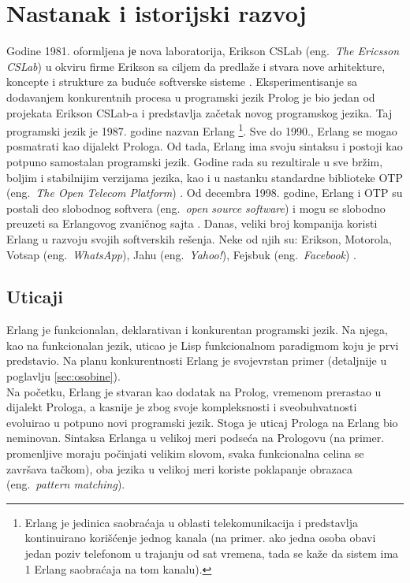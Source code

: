 \documentclass[a4paper]{article}
\begin{document}
\section{Nastanak i istorijski razvoj}
\label{sec:nastanak}
Godine 1981. oformljena је nova laboratorija, Erikson CSLab (eng.~{\em The Ericsson CSLab}) u okviru firme Erikson sa
ciljem da predlaže i stvara nove arhitekture, koncepte i strukture za buduće softverske sisteme \cite{phdthesis}.
Eksperimentisanje sa dodavanjem konkurentnih procesa u programski jezik Prolog je bio jedan
od projekata Erikson CSLab-a i predstavlja začetak novog programskog jezika.
Taj programski jezik je 1987. godine nazvan Erlang
\footnote{ Erlang je jedinica saobraćaja u oblasti telekomunikacija 
i predstavlja kontinuirano korišćenje jednog kanala 
(na primer. ako jedna osoba obavi jedan poziv telefonom u trajanju od sat vremena, 
tada se kaže da sistem ima 1 Erlang saobraćaja na tom kanalu).}.    
Sve do 1990., Erlang se mogao posmatrati kao dijalekt Prologa. Od tada, Erlang
ima svoju sintaksu i postoji kao potpuno samostalan programski jezik.
Godine rada su rezultirale u sve bržim, boljim i stabilnijim verzijama jezika, kao
i u nastanku standardne biblioteke OTP (eng.~{\em The Open Telecom Platform}) \cite{phdthesis}.
Od decembra 1998. godine, Erlang i OTP su postali deo slobodnog softvera (eng.~{\em open source software})
i mogu se slobodno preuzeti sa Erlangovog zvaničnog sajta \cite{sajt}.
Danas, veliki broj kompanija koristi Erlang u razvoju
svojih softverskih rešenja. Neke od njih su: Erikson, Motorola, Votsap (eng.~{\em WhatsApp}), 
Jahu (eng.~{\em Yahoo!}), Fejsbuk (eng.~{\em Facebook}) \cite{sajt}.


\subsection{Uticaji}
\label{subsec:uticaji}
Erlang je funkcionalan, deklarativan i konkurentan programski jezik.
Na njega, kao na funkcionalan jezik, uticao je Lisp funkcionalnom paradigmom koju je 
prvi predstavio. Na planu konkurentnosti Erlang je svojevrstan primer (detaljnije u poglavlju \ref{sec:osobine}). \\ 

Na početku, Erlang je stvaran kao dodatak na Prolog, vremenom prerastao u 
dijalekt Prologa, a kasnije je zbog svoje kompleksnosti i sveobuhvatnosti evoluirao
u potpuno novi programski jezik. Stoga je uticaj Prologa na Erlang bio 
neminovan. Sintaksa Erlanga u velikoj meri podseća na Prologovu 
(na primer. promenljive moraju počinjati velikim slovom, 
svaka funkcionalna celina se završava tačkom), oba jezika u velikoj meri koriste poklapanje obrazaca
(eng.~{\em pattern matching}). \\
\end{document}
